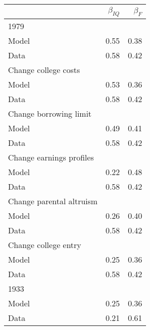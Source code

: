 \begin{tabular}{lrr}
\hline
  & $\beta_{IQ}$  & $\beta_{F}$  \\ 
\hline
1979 &   &   \\ 
Model & 0.55  & 0.38  \\ 
Data & 0.58  & 0.42  \\ 
Change college costs &   &   \\ 
Model & 0.53  & 0.36  \\ 
Data & 0.58  & 0.42  \\ 
Change borrowing limit &   &   \\ 
Model & 0.49  & 0.41  \\ 
Data & 0.58  & 0.42  \\ 
Change earnings profiles &   &   \\ 
Model & 0.22  & 0.48  \\ 
Data & 0.58  & 0.42  \\ 
Change parental altruism &   &   \\ 
Model & 0.26  & 0.40  \\ 
Data & 0.58  & 0.42  \\ 
Change college entry &   &   \\ 
Model & 0.25  & 0.36  \\ 
Data & 0.58  & 0.42  \\ 
1933 &   &   \\ 
Model & 0.25  & 0.36  \\ 
Data & 0.21  & 0.61  \\ 
\hline
\end{tabular}%
